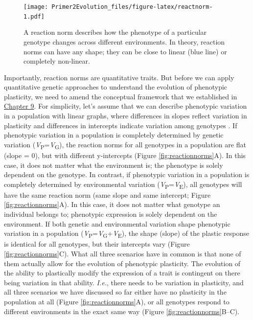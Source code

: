 \documentclass[
]{book}
\begin{document}
\begin{figure}
\centering
\texttt{[image: Primer2Evolution\_files/figure-latex/reactnorm-1.pdf]}
\caption{\label{fig:reactnorm}A reaction norm describes how the phenotype of a particular genotype changes across different environments. In theory, reaction norms can have any shape; they can be close to linear (blue line) or completely non-linear.}
\end{figure}

Importantly, reaction norms are quantitative traits. But before we can apply quantitative genetic approaches to understand the evolution of phenotypic plasticity, we need to amend the conceptual framework that we established in \href{the-evolution-of-quantitative-traits.html\#quantifying-trait-heritability}{Chapter 9}. For simplicity, let's assume that we can describe phenotypic variation in a population with linear graphs, where differences in slopes reflect variation in plasticity and differences in intercepts indicate variation among genotypes . If phenotypic variation in a population is completely determined by genetic variation (\emph{V}\textsubscript{P}=\emph{V}\textsubscript{G}), the reaction norms for all genotypes in a population are flat (slope = 0), but with different y-intercepts (Figure \ref{fig:reactionnorms}A). In this case, it does not matter what the environment is; the phenotype is solely dependent on the genotype. In contrast, if phenotypic variation in a population is completely determined by environmental variation (\emph{V}\textsubscript{P}=\emph{V}\textsubscript{E}), all genotypes will have the same reaction norm (same slope and same intercept; Figure \ref{fig:reactionnorms}A). In this case, it does not matter what genotype an individual belongs to; phenotypic expression is solely dependent on the environment. If both genetic and environmental variation shape phenotypic variation in a population (\emph{V}\textsubscript{P}=\emph{V}\textsubscript{G}+\emph{V}\textsubscript{E}), the shape (slope) of the plastic response is identical for all genotypes, but their intercepts vary (Figure \ref{fig:reactionnorms}C). What all three scenarios have in common is that none of them actually allow for the evolution of phenotypic plasticity. The evolution of the ability to plastically modify the expression of a trait is contingent on there being variation in that ability. \emph{I.e.}, there needs to be variation in plasticity, and all three scenarios we have discussed so far either have no plasticity in the population at all (Figure \ref{fig:reactionnorms}A), or all genotypes respond to different environments in the exact same way (Figure \ref{fig:reactionnorms}B--C).
\end{document}
